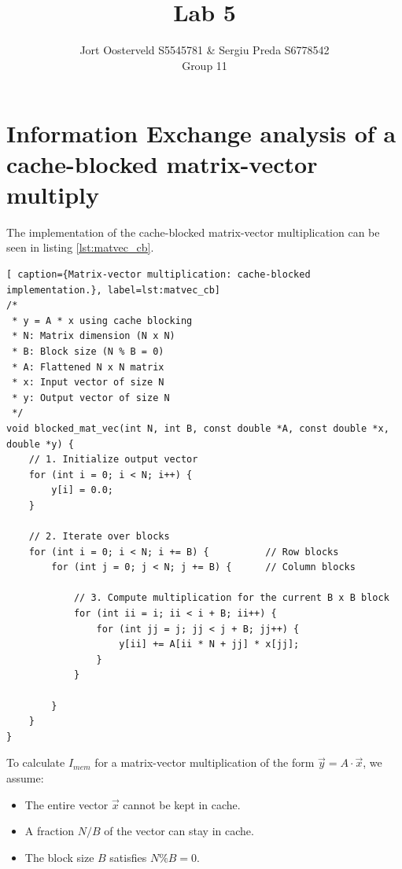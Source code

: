 \documentclass[a4paper,11pt]{article}
\title{\Large{\sc{Performance Engineering}}\\[2mm] Lab 5}
\author{Jort Oosterveld S5545781 \& Sergiu Preda S6778542 \\ Group 11}
\begin{document}
\setlength\parindent{0pt}
\setlength{\parskip}{0.6em}

\maketitle

\section{Information Exchange analysis of a cache-blocked matrix-vector multiply}

The implementation of the cache-blocked matrix-vector multiplication can be seen in listing \ref{lst:matvec_cb}.
\begin{lstlisting}[ caption={Matrix-vector multiplication: cache-blocked implementation.}, label=lst:matvec_cb]
/* 
 * y = A * x using cache blocking
 * N: Matrix dimension (N x N)
 * B: Block size (N % B = 0)
 * A: Flattened N x N matrix 
 * x: Input vector of size N
 * y: Output vector of size N
 */
void blocked_mat_vec(int N, int B, const double *A, const double *x, double *y) {
    // 1. Initialize output vector
    for (int i = 0; i < N; i++) {
        y[i] = 0.0;
    }

    // 2. Iterate over blocks
    for (int i = 0; i < N; i += B) {          // Row blocks
        for (int j = 0; j < N; j += B) {      // Column blocks
            
            // 3. Compute multiplication for the current B x B block
            for (int ii = i; ii < i + B; ii++) {
                for (int jj = j; jj < j + B; jj++) {
                    y[ii] += A[ii * N + jj] * x[jj];
                }
            }
            
        }
    }
}
\end{lstlisting}

To calculate $I_{mem}$ for a matrix-vector multiplication of the form $\vec{y} = A \cdot \vec{x}$, we assume:
\begin{itemize}
    \item The entire vector $\vec{x}$ cannot be kept in cache.
    \item A fraction $N/B$ of the vector can stay in cache.
    \item The block size $B$ satisfies $N\%B = 0$.
\end{itemize}
\end{document}
